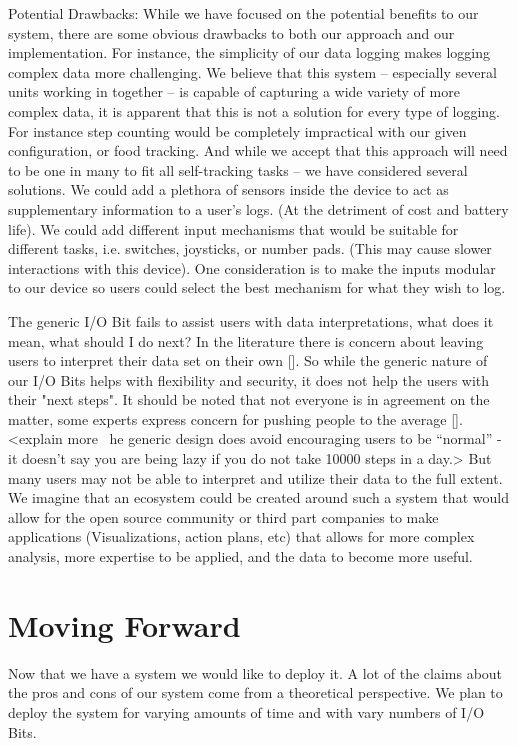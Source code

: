 \documentclass[sigchi-a, authorversion]{acmart}
\begin{document}
Potential Drawbacks:
While we have focused on the potential benefits to our system, there are some obvious drawbacks to both our approach and our implementation. For instance, the simplicity of our data logging makes logging complex data more challenging. We believe that this system – especially several units working in together – is capable of capturing a wide variety of more complex data, it is apparent that this is not a solution for every type of logging. For instance step counting would be completely impractical with our given configuration, or food tracking. And while we accept that this approach will need to be one in many to fit all self-tracking tasks – we have considered several solutions. We could add a plethora of sensors inside the device to act as supplementary information to a user’s logs. (At the detriment of cost and battery life). We could add different input mechanisms that would be suitable for different tasks, i.e. switches, joysticks, or number pads. (This may cause slower interactions with this device). One consideration is to make the inputs modular to our device so users could select the best mechanism for what they wish to log. 

The generic I/O Bit fails to assist users with data interpretations, what does it mean, what should I do next? In the literature there is concern about leaving users to interpret their data set on their own []. So while the generic nature of our I/O Bits helps with flexibility and security, it does not help the users with their "next steps". It should be noted that not everyone is in agreement on the matter, some experts express concern for pushing people to the average []. <explain more ~he generic design does avoid encouraging users to be “normal” - it doesn’t say you are being lazy if you do not take 10000 steps in a day.> But many users may not be able to interpret and utilize their data to the full extent. We imagine that an ecosystem could be created around such a system that would allow for the open source community or third part companies to make applications (Visualizations, action plans, etc) that allows for more complex analysis, more expertise to be applied, and the data to become more useful.

 
\section{Moving Forward}
Now that we have a system we would like to deploy it. A lot of the claims about the pros and cons of our system come from a theoretical perspective. We plan to deploy the system for varying amounts of time and with vary numbers of I/O Bits. \cite{CHINOSAUR:venue}
\end{document}
